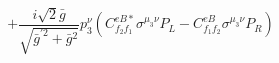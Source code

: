 %
\begin{dmath*}
%
  +  \frac{i \sqrt{2} {\bar g}{}}{\sqrt{{\bar g}^{\prime 2} + {\bar g}{}^2}}p_3^{\nu} \left(C^{eB*}_{f_2 f_1} \sigma^{\mu_3 \nu } P_L  - C^{eB}_{f_1 f_2} \sigma^{\mu_3 \nu } P_R \right)
%
\end{dmath*}
%
